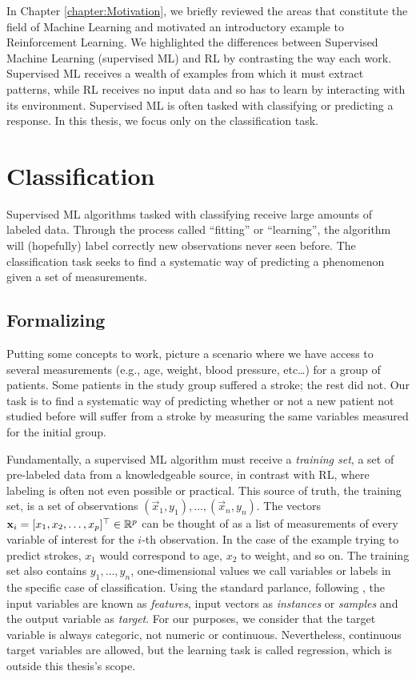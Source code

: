 In Chapter \ref{chapter:Motivation}, we briefly reviewed the areas that
constitute the field of Machine Learning and motivated an introductory example
to Reinforcement Learning. We highlighted the differences between Supervised
Machine Learning (supervised ML) and RL by contrasting the way each work.
Supervised ML receives a wealth of examples from which it must extract patterns,
while RL receives no input data and so has to learn by interacting with its
environment. Supervised ML is often tasked with classifying or predicting a
response. In this thesis, we focus only on the classification task.

\section{Classification}
Supervised ML algorithms tasked with classifying receive large amounts of
labeled data. Through the process called ``fitting'' or ``learning'', the
algorithm will (hopefully) label correctly new observations never seen before.
The classification task seeks to find a systematic way of predicting a
phenomenon given a set of measurements.

\subsection{Formalizing}
Putting some concepts to work, picture a scenario where we have access to
several measurements (e.g., age, weight, blood pressure, etc\dots) for a group
of patients. Some patients in the study group suffered a stroke; the rest did
not. Our task is to find a systematic way of predicting whether or not a new
patient not studied before will suffer from a stroke by measuring the same
variables measured for the initial group.

Fundamentally, a supervised ML algorithm must receive a \textit{training set}, a
set of pre-labeled data from a knowledgeable source, in contrast with RL, where
labeling is often not even possible or practical. This source of truth, the
training set, is a set of observations $(\vec{x}_1, y_1), \dots, (\vec{x}_n,
y_n)$. The vectors $\mathbf{x}_i = [x_1, x_2, \dots, x_p]^{\top} \in \mathbb{R}^{p}$ can be
thought of as a list of measurements of every variable of interest for the
$i$-th observation. In the case of the example trying to predict strokes, $x_1$
would correspond to age, $x_2$ to weight, and so on. The training set also
contains $y_1, \dots, y_n$, one-dimensional values we call variables or labels
in the specific case of classification. Using the standard parlance, following
\cite{louppe2014}, the input variables are known as \textit{features}, input
vectors as \textit{instances} or \textit{samples} and the output variable as
\textit{target}. For our purposes, we consider that the target variable is
always categoric, not numeric or continuous. Nevertheless, continuous target
variables are allowed, but the learning task is called regression, which is
outside this thesis's scope.

